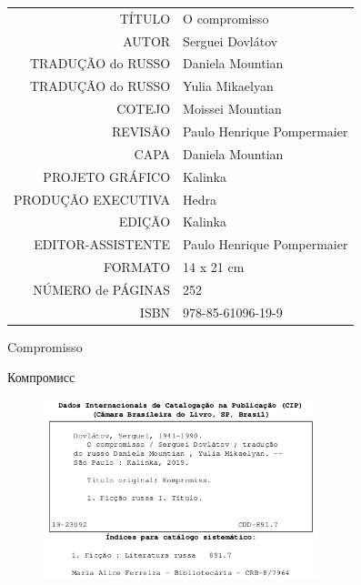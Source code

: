 \begin{vplace}[1]
\begin{table}[ht!]
\MyriadPro
\scriptsize
\begin{tabular}{rl}
TÍTULO            & O compromisso 									   \\[2pt]
AUTOR             & Serguei Dovlátov                          		   \\[2pt]
TRADUÇÃO do RUSSO & Daniela Mountian                                   \\[2pt]
TRADUÇÃO do RUSSO & Yulia Mikaelyan 	 			                   \\[2pt]
COTEJO            & Moissei Mountian 							       \\[2pt]
REVISÃO           & Paulo Henrique Pompermaier                         \\[2pt]
CAPA              & Daniela Mountian                                   \\[2pt]
PROJETO GRÁFICO   & Kalinka                                            \\[2pt]
PRODUÇÃO EXECUTIVA & Hedra                                             \\[2pt]
EDIÇÃO            & Kalinka 		                                   \\[2pt] 
EDITOR-ASSISTENTE & Paulo Henrique Pompermaier                         \\[2pt] 
FORMATO           & 14 x 21 cm                                         \\[2pt]
NÚMERO de PÁGINAS & 252                                                \\[2pt]
ISBN              & 978-85-61096-19-9                                 
\end{tabular}
\end{table}
\end{vplace}

\newpage
\MyriadPro
\begin{center}
\small
Compromisso

Компромисс
\end{center}

\scriptsize


\begin{figure}[!ht]
\centering

  \includegraphics[width=80mm]{./imgs/ficha.jpg}
 \end{figure}


